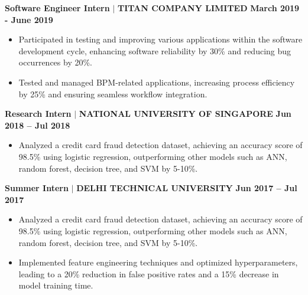 \documentclass{article}
\begin{document}
\vspace{1mm}

\noindent\textbf{Software Engineer Intern  } $\mid$ \textbf{TITAN COMPANY LIMITED } \hfill \textbf{March 2019 - June 2019 }
 \begin{itemize}[noitemsep,nolistsep,leftmargin=*]
\item Participated in testing and improving various applications within the software development cycle, enhancing software reliability by 30\% and reducing bug occurrences by 20\%.
\item Tested and managed BPM-related applications, increasing process efficiency by 25\% and ensuring seamless workflow integration.
 \end{itemize}

\vspace{1mm}

\noindent\textbf{ Research Intern } $\mid$ \textbf{NATIONAL UNIVERSITY OF SINGAPORE} \hfill \textbf{Jun 2018 – Jul 2018 }
 \begin{itemize}[noitemsep,nolistsep,leftmargin=*]
\item Analyzed a credit card fraud detection dataset, achieving an accuracy score of 98.5\% using logistic regression, outperforming other models such as ANN, random forest, decision tree, and SVM by 5-10\%.


\end{itemize}

\vspace{1mm}
\noindent\textbf{Summer Intern} $\mid$ \textbf{DELHI TECHNICAL UNIVERSITY} \hfill \textbf{Jun 2017 – Jul 2017}
\begin{itemize}[noitemsep,nolistsep,leftmargin=*]
\item Analyzed a credit card fraud detection dataset, achieving an accuracy score of 98.5\% using logistic regression, outperforming other models such as ANN, random forest, decision tree, and SVM by 5-10\%.
\item Implemented feature engineering techniques and optimized hyperparameters, leading to a 20\% reduction in false positive rates and a 15\% decrease in model training time.
\end{itemize}
\vspace{2mm}





\vspace{1mm}
\end{document}
